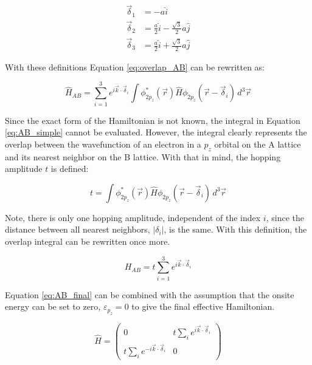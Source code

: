\begin{align}
    \vec{\delta}_1 &= -a\hat{i} \nonumber \\
    \vec{\delta}_2 &= \frac{a}{2}\hat{i} - \frac{\sqrt{3}}{2}a\hat{j} \label{eq:deltas} \\
    \vec{\delta}_3 &= \frac{a}{2}\hat{i} + \frac{\sqrt{3}}{2}a\hat{j} \nonumber 
\label{eq:deltas}
\end{align}

With these definitions Equation \ref{eq:overlap_AB} can be rewritten as:

\begin{equation}
\label{eq:AB_simple}
    \hat{H}_{AB} = \sum_{i=1}^{3} e^{i\vec{k}\cdot\vec{\delta}_i} \int \phi^*_{2p_z}(\vec{r}) \hat{H} \phi_{2p_z}(\vec{r}- \vec{\delta}_i) \, d^3\vec{r}
\end{equation}

Since the exact form of the Hamiltonian is not known, the integral in Equation \ref{eq:AB_simple} cannot be evaluated. However, the integral clearly represents the overlap between the wavefunction of an electron in a $p_z$ orbital on the A lattice and its nearest neighbor on the B lattice. With that in mind, the hopping amplitude $t$ is defined:

\begin{equation}
\label{eq:hopping_amp}
    t = \int \phi^*_{2p_z}(\vec{r}) \hat{H} \phi_{2p_z}(\vec{r}-\vec{\delta}_i) \, d^3\vec{r}
\end{equation}

Note, there is only one hopping amplitude, independent of the index $i$, since the distance between all nearest neighbors, $\lvert \delta_i \rvert$, is the same. With this definition, the overlap integral can be rewritten once more.

\begin{equation}
\label{eq:AB_final}
    H_{AB} = t \sum_{i=1}^{3} e^{i\vec{k}\cdot\vec{\delta}_i}
\end{equation}

Equation \ref{eq:AB_final} can be combined with the assumption that the onsite energy can be set to zero, $\varepsilon_{p_z} = 0$ to give the final effective Hamiltonian.

\begin{equation}
\label{eq:effective_H}
    \hat{H} = \begin{pmatrix} 0 & t \sum_{i}^{} e^{i\vec{k}\cdot\vec{\delta}_i} \\  t \sum_{i}^{} e^{-i\vec{k}\cdot\vec{\delta}_i} & 0 \end{pmatrix}
\end{equation}

